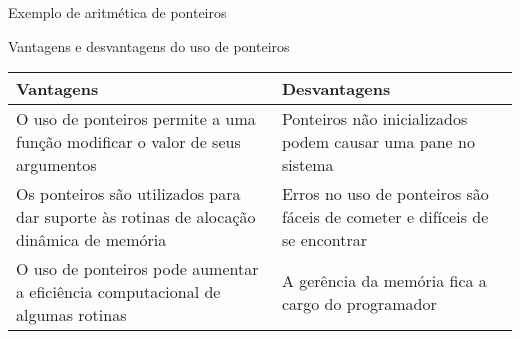 \begin{frame}[fragile]{Exemplo de aritmética de ponteiros}
\end{frame}

\begin{frame}[fragile]{Vantagens e desvantagens do uso de ponteiros}

    \begin{tabular}{p{5cm}p{5cm}}
    \toprule
    \textbf{Vantagens} & \textbf{Desvantagens} \\
    \midrule
    O uso de ponteiros permite a uma função modificar o valor de seus argumentos &
    Ponteiros não inicializados podem causar uma pane no sistema \\
    \midrule
    \rowcolor[gray]{0.9}
    Os ponteiros são utilizados para dar suporte às rotinas de alocação dinâmica de memória &
    Erros no uso de ponteiros são fáceis de cometer e difíceis de se encontrar \\
    \midrule
    O uso de ponteiros pode aumentar a eficiência computacional de algumas rotinas &
	A gerência da memória fica a cargo do programador \\
    \bottomrule
    \end{tabular}
\end{frame}   
